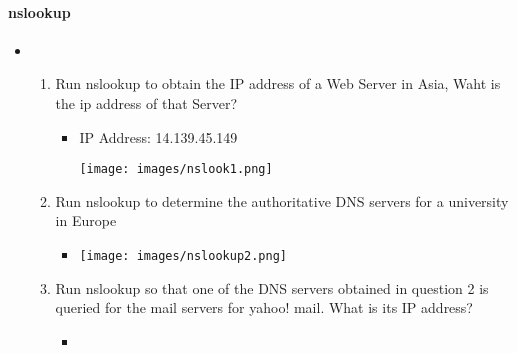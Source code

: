 \documentclass{article}
\begin{document}
\paragraph{nslookup}
\begin{itemize}
  \item\begin{enumerate}
    \item Run nslookup to obtain the IP address of a Web Server in Asia, Waht is the ip address of that Server?
      \begin{itemize}
        \item IP Address: 14.139.45.149 \par
        \texttt{[image: images/nslook1.png]}
      \end{itemize}
    \item Run nslookup to determine the authoritative DNS servers for a university in Europe
        \begin{itemize}
          \item \texttt{[image: images/nslookup2.png]}
        \end{itemize}

    \item Run nslookup so that one of the DNS servers obtained in question 2 is queried for the mail servers for yahoo! mail.  What is its IP address?
        \begin{itemize}
          \item 
        \end{itemize}
  \end{enumerate}
\end{itemize}
\end{document}
